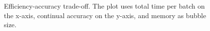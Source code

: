 \begin{figure}[t]
\centering
\fbox{\rule{0pt}{1.05in}\rule{0.94\columnwidth}{0pt}}
\caption{Efficiency-accuracy trade-off. The plot uses total time per batch on the x-axis, continual accuracy on the y-axis, and memory as bubble size.}
\label{fig:eff}
\end{figure}
